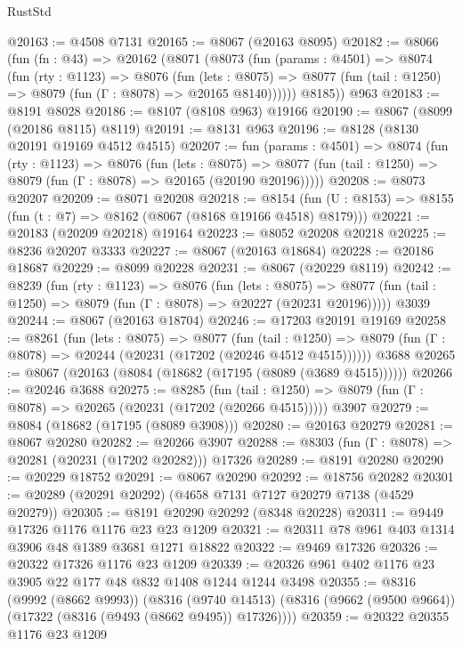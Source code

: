 \begin{lexlean}{RustStd}
\begin{coremodule}
@20163 := @4508 @7131
@20165 := @8067 (@20163 @8095)
@20182 := @8066
    (fun (fn : @43) =>
    @20162
      (@8071
        (@8073
          (fun (params : @4501) =>
          @8074
            (fun (rty : @1123) =>
            @8076
              (fun (lets : @8075) =>
              @8077 (fun (tail : @1250) => @8079 (fun (Γ : @8078) => @20165 @8140))))))
        @8185))
    @963
@20183 := @8191 @8028
@20186 := @8107 (@8108 @963) @19166
@20190 := @8067 (@8099 (@20186 @8115) @8119)
@20191 := @8131 @963
@20196 := @8128 (@8130 @20191 @19169 @4512 @4515)
@20207 := fun (params : @4501) =>
  @8074
    (fun (rty : @1123) =>
    @8076
      (fun (lets : @8075) =>
      @8077 (fun (tail : @1250) => @8079 (fun (Γ : @8078) => @20165 (@20190 @20196)))))
@20208 := @8073 @20207
@20209 := @8071 @20208
@20218 := @8154
    (fun (U : @8153) => @8155 (fun (t : @7) => @8162 (@8067 (@8168 @19166 @4518) @8179)))
@20221 := @20183 (@20209 @20218) @19164
@20223 := @8052 @20208 @20218
@20225 := @8236 @20207 @3333
@20227 := @8067 (@20163 @18684)
@20228 := @20186 @18687
@20229 := @8099 @20228
@20231 := @8067 (@20229 @8119)
@20242 := @8239
    (fun (rty : @1123) =>
    @8076
      (fun (lets : @8075) =>
      @8077 (fun (tail : @1250) => @8079 (fun (Γ : @8078) => @20227 (@20231 @20196)))))
    @3039
@20244 := @8067 (@20163 @18704)
@20246 := @17203 @20191 @19169
@20258 := @8261
    (fun (lets : @8075) =>
    @8077
      (fun (tail : @1250) =>
      @8079 (fun (Γ : @8078) => @20244 (@20231 (@17202 (@20246 @4512 @4515))))))
    @3688
@20265 := @8067 (@20163 (@8084 (@18682 (@17195 (@8089 (@3689 @4515))))))
@20266 := @20246 @3688
@20275 := @8285
    (fun (tail : @1250) => @8079 (fun (Γ : @8078) => @20265 (@20231 (@17202 (@20266 @4515)))))
    @3907
@20279 := @8084 (@18682 (@17195 (@8089 @3908)))
@20280 := @20163 @20279
@20281 := @8067 @20280
@20282 := @20266 @3907
@20288 := @8303 (fun (Γ : @8078) => @20281 (@20231 (@17202 @20282))) @17326
@20289 := @8191 @20280
@20290 := @20229 @18752
@20291 := @8067 @20290
@20292 := @18756 @20282
@20301 := @20289 (@20291 @20292) (@4658 @7131 @7127 @20279 @7138 (@4529 @20279))
@20305 := @8191 @20290 @20292 (@8348 @20228)
@20311 := @9449 @17326 @1176 @1176 @23 @23 @1209
@20321 := @20311 @78 @961 @403 @1314 @3906 @48 @1389 @3681 @1271 @18822
@20322 := @9469 @17326
@20326 := @20322 @17326 @1176 @23 @1209
@20339 := @20326 @961 @402 @1176 @23 @3905 @22 @177 @48 @832 @1408 @1244 @1244 @3498
@20355 := @8316
    (@9992 (@8662 @9993))
    (@8316
      (@9740 @14513)
      (@8316 (@9662 (@9500 @9664)) (@17322 (@8316 (@9493 (@8662 @9495)) @17326))))
@20359 := @20322 @20355 @1176 @23 @1209

\end{coremodule}
\end{lexlean}
